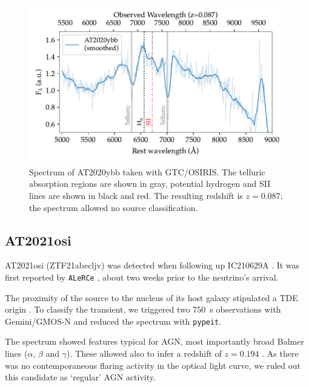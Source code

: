 \documentclass[
    a4paper, %
    fontsize=10pt, %
    twoside=true, %
    numbers=noenddot, %
    fontmethod=tex,
]{kaobook}
\begin{document}
\begin{figure}[htb]
    \includegraphics[width=1\textwidth]{fu/ZTF20acmxnpa_spectrum.pdf}
    \caption[AT2020ybb spectrum]{Spectrum of AT2020ybb taken with GTC/OSIRIS. The telluric absorption regions are shown in gray, potential hydrogen and SII lines are shown in black and red. The resulting redshift is $z=0.087$; the spectrum allowed no source classification.}
\end{figure}

\subsection{AT2021osi}
AT2021osi (ZTF21abecljv) was detected when following up IC210629A . It was first reported by \texttt{ALeRCe} , about two weeks prior to the neutrino's arrival. 

The proximity of the source to the nucleus of its host galaxy stipulated a TDE origin . To classify the transient, we triggered two \SI{750}{\second} observations with Gemini/GMOS-N and reduced the spectrum with \texttt{pypeit}.

The spectrum showed features typical for AGN, most importantly broad Balmer lines ($\alpha$, $\beta$ and $\gamma$). These allowed also to infer a redshift of $z=0.194$ . As there was no contemporaneous flaring activity in the optical light curve, we ruled out this candidate as `regular' AGN activity.
\end{document}
